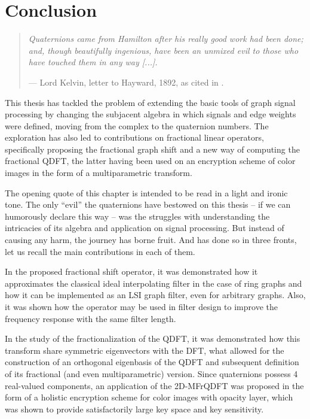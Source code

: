 \chapter{Conclusion}
\label{ch:conclusion}

\begin{quotation}
    \itshape
    Quaternions came from Hamilton after his really good work had been done; and, though beautifully ingenious, have been an unmixed evil to those who have touched them in any way [...].

    \noindent --- Lord Kelvin, letter to Hayward, 1892, as cited in \cite{altmann1989hamilton}.
\end{quotation}

This thesis has tackled the problem of extending the basic tools of graph signal processing by changing the subjacent algebra in which signals and edge weights were defined, moving from the complex to the quaternion numbers. The exploration has also led to contributions on fractional linear operators, specifically proposing the fractional graph shift and a new way of computing the fractional QDFT, the latter having been used on an encryption scheme of color images in the form of a multiparametric transform.

The opening quote of this chapter is intended to be read in a light and ironic tone. The only ``evil'' the quaternions have bestowed on this thesis -- if we can humorously declare this way --  was the struggles with understanding the intricacies of its algebra and application on signal processing. But instead of causing any harm, the journey has borne fruit. And has done so in three fronts, let us recall the main contributions in each of them.

In the proposed fractional shift operator, it was demonstrated how it approximates  the classical ideal interpolating filter in the case of ring graphs and how it can be implemented as an LSI graph filter, even for arbitrary graphs. Also, it was shown how the operator may be used in filter design to improve the frequency response with the same filter length.

In the study of the fractionalization of the QDFT, it was demonstrated how this transform share symmetric eigenvectors with the DFT, what allowed for the construction of an orthogonal eigenbasis of the QDFT and subsequent definition of its fractional (and even multiparametric) version. Since quaternions possess 4 real-valued components, an application of the 2D-MFrQDFT was proposed in the form of a holistic encryption scheme for color images with opacity layer, which was shown to provide satisfactorily large key space and key sensitivity.

